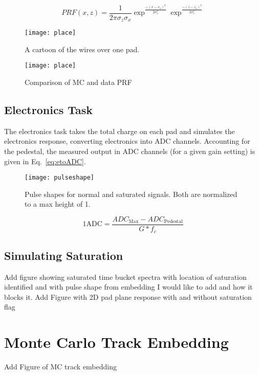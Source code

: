 \begin{equation}
PRF(x,z) = \frac{1}{2\pi\sigma_z\sigma_x}\exp^{\frac{-{(x-x_o)}^2}{2\sigma_x^2}}\exp^{\frac{-{(z-z_o)}^2}{2\sigma_z^2}}
\label{eq:softPRF}
\end{equation}

\begin{figure}
\texttt{[image: place]}
\caption{A cartoon of the wires over one pad. }
\label{fig:onepad}
\end{figure}

\begin{figure}
\texttt{[image: place]}
\caption{Comparison of MC and data PRF}
\label{fig:mcdataPRF}
\end{figure}

\subsection{Electronics Task}
The electronics task takes the total charge on each pad and simulates the electronics response, converting electronics into ADC channels. Accounting for the pedestal, the measured output in ADC channels (for a given gain setting) is given in Eq.~\ref{eq:etoADC}.


\begin{figure}[!hbt]
\texttt{[image: pulseshape]}
\caption{Pulse shapes for normal and saturated signals. Both are normalized to a max height of 1.}
\label{fig:pulseshape}
\end{figure}


\begin{equation}
\mathrm{1 ADC }= \frac{ADC_{\mathrm{Max}} - ADC_{\mathrm{Pedestal}}}{G*f_c}
\label{eq:etoADC}
\end{equation}

\subsection{Simulating Saturation}
Add figure showing saturated time bucket spectra with location of saturation identified and with pulse shape from embedding I would like to add and how it blocks it.
Add Figure with 2D pad plane response with and without saturation flag


\section{Monte Carlo Track Embedding}
Add Figure of MC track embedding 



